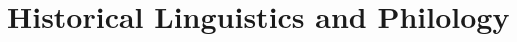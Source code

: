 \documentclass[output=short             %
	        ,collection
	        ,collectionchapter
	        ,collectiontoclongg
 	        ,biblatex  
		  ]{langsci/langscibook}
\begin{document}
         
\maketitle                
\frontmatter

\tableofcontents
% 
% 

\mainmatter          

 


\part{Historical Linguistics and Philology}
% 
% 
% 
% 




\end{document}
